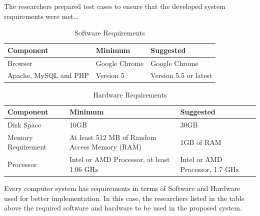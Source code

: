 The researchers prepared test cases to ensure that the developed system requirements were met…

\begin{table}[H]
	\centering
	\caption{Software Requirements}
	\begin{tabular}{ | C{4cm} | C{6cm} | C{4cm} |} 
		\hline
		Component & Minimum	& Suggested \\
		\hline
		Browser & Google Chrome & Google Chrome \\
		\hline
		Apache, MySQL  and PHP	& Version 5 & Version 5.5 or latest \\
		\hline
		
	\end{tabular}
\end{table}

\begin{table}[H]
	\centering
	\caption{Hardware Requirements}
	\begin{tabular}{ | C{4cm} | C{6cm} | C{4cm} |} 
		\hline
		Component & Minimum	& Suggested \\
		\hline
		Disk Space & 10GB & 30GB \\
		\hline
		Memory Requirement & At least 512 MB of Random Access Memory (RAM) & 1GB of RAM \\
		\hline
		Processor &	Intel or AMD Processor, at least 1.06 GHz	& Intel or AMD Processor, 1.7 GHz \\
		\hline
	\end{tabular}
\end{table}

Every computer system has requirements in terms of Software and Hardware used for better implementation. In this case, the researchers listed in the table above the required software and hardware to be used in the proposed system.


